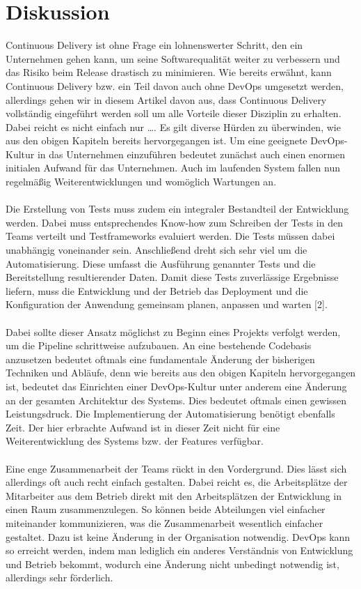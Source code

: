 \section{Diskussion}
Continuous Delivery ist ohne Frage ein lohnenswerter Schritt, den ein Unternehmen gehen kann, um seine Softwarequalität weiter zu verbessern und das Risiko beim Release drastisch zu minimieren. Wie bereits erwähnt, kann Continuous Delivery bzw. ein Teil davon auch ohne DevOps umgesetzt werden, allerdings gehen wir in diesem Artikel davon aus, dass Continuous Delivery vollständig eingeführt werden soll um alle Vorteile dieser Disziplin zu erhalten. Dabei reicht es nicht einfach nur …. Es gilt diverse Hürden zu überwinden, wie aus den obigen Kapiteln bereits hervorgegangen ist. Um eine geeignete DevOps-Kultur in das Unternehmen einzuführen bedeutet zunächst auch einen enormen initialen Aufwand für das Unternehmen. Auch im laufenden System fallen nun regelmäßig Weiterentwicklungen und womöglich Wartungen an.\\ \\
Die Erstellung von Tests muss zudem ein integraler Bestandteil der Entwicklung werden. Dabei muss entsprechendes Know-how zum Schreiben der Tests in den Teams verteilt und Testframeworks evaluiert werden. Die Tests müssen dabei unabhängig voneinander sein. Anschließend dreht sich sehr viel um die Automatisierung. Diese umfasst die Ausführung genannter Tests und die Bereitstellung resultierender Daten. Damit diese Tests zuverlässige Ergebnisse liefern, muss die Entwicklung und der Betrieb das Deployment und die Konfiguration der Anwendung gemeinsam planen, anpassen und warten [2].\\ \\
Dabei sollte dieser Ansatz möglichst zu Beginn eines Projekts verfolgt werden, um die Pipeline schrittweise aufzubauen. An eine bestehende Codebasis anzusetzen bedeutet oftmals eine fundamentale Änderung der bisherigen Techniken und Abläufe, denn wie bereits aus den obigen Kapiteln hervorgegangen ist, bedeutet das Einrichten einer DevOps-Kultur unter anderem eine Änderung an der gesamten Architektur des Systems. Dies bedeutet oftmals einen gewissen Leistungsdruck. Die Implementierung der Automatisierung benötigt ebenfalls Zeit. Der hier erbrachte Aufwand ist in dieser Zeit nicht für eine Weiterentwicklung des Systems bzw. der Features verfügbar.\\ \\
Eine enge Zusammenarbeit der Teams rückt in den Vordergrund. Dies lässt sich allerdings oft auch recht einfach gestalten. Dabei reicht es, die Arbeitsplätze der Mitarbeiter aus dem Betrieb direkt mit den Arbeitsplätzen der Entwicklung in einen Raum zusammenzulegen. So können beide Abteilungen viel einfacher miteinander kommunizieren, was die Zusammenarbeit wesentlich einfacher gestaltet. Dazu ist keine Änderung in der Organisation notwendig. DevOps kann so erreicht werden, indem man lediglich ein anderes Verständnis von Entwicklung und Betrieb bekommt, wodurch eine Änderung nicht unbedingt notwendig ist, allerdings sehr förderlich.\\ \\
